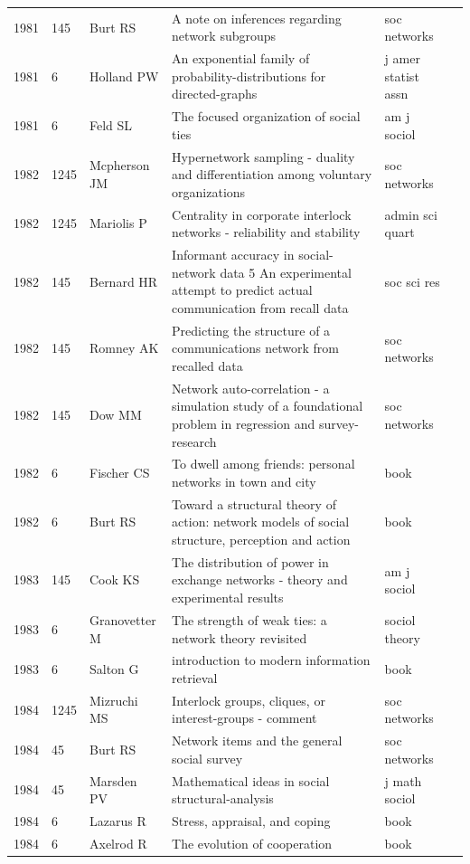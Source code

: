 \documentclass[11pt]{article} %
\begin{document}
\begin{landscape}
\begin{longtable}{p{0.7cm}|p{0.8cm}|p{3cm}|p{14.5cm}|p{3.5cm}l}
1981& 	145& 	 Burt RS& 	 A note on inferences regarding network subgroups& 	 soc networks\\
1981& 	6& 	 Holland PW& 	 An exponential family of probability-distributions for directed-graphs& 	 j amer statist assn\\
1981& 	6& 	 Feld SL& 	 The focused organization of social ties& 	 am j sociol\\
1982& 	1245& 	 Mcpherson JM& 	 Hypernetwork sampling - duality and differentiation among voluntary organizations& 	 soc networks\\
1982& 	1245& 	 Mariolis P& 	 Centrality in corporate interlock networks - reliability and stability& 	 admin sci quart\\
1982& 	145& 	 Bernard HR& 	 Informant accuracy in social-network data 5 An experimental attempt to predict actual communication from recall data& 	 soc sci res\\
1982& 	145& 	 Romney AK& 	 Predicting the structure of a communications network from recalled data& 	 soc networks\\
1982& 	145& 	 Dow MM& 	 Network auto-correlation - a simulation study of a foundational problem in regression and survey-research& 	 soc networks\\
1982& 	6& 	 Fischer CS& 	 To dwell among friends: personal networks in town and city& 	 book\\
1982& 	6& 	 Burt RS & 	 Toward a structural theory of action: network models of social structure, perception and action& 	 book\\
1983& 	145& 	 Cook KS& 	 The distribution of power in exchange networks - theory and experimental results& 	 am j sociol\\
1983& 	6& 	 Granovetter M & 	The strength of weak ties: a network theory revisited& 	 sociol theory\\
1983& 	6& 	 Salton G& 	 introduction to modern information retrieval& 	 book\\
1984& 	1245& 	 Mizruchi MS& 	 Interlock groups, cliques, or interest-groups - comment& 	 soc networks\\
1984& 	45& 	 Burt RS& 	 Network items and the general social survey& 	 soc networks\\
1984& 	45& 	 Marsden PV& 	 Mathematical ideas in social structural-analysis& 	 j math sociol\\
1984& 	6& 	 Lazarus R& 	 Stress, appraisal, and coping& 	 book\\
1984& 	6& 	 Axelrod R& 	 The evolution of cooperation& 	 book\\

\end{longtable}
\end{landscape}
\end{document}
